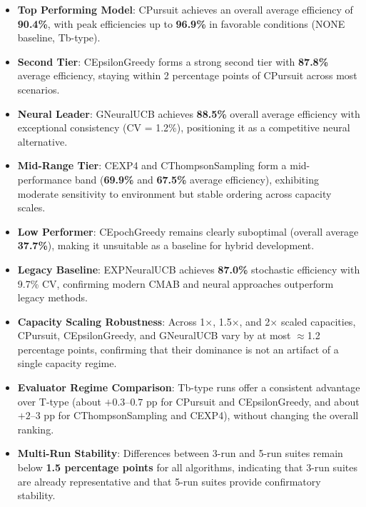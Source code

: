 \documentclass[12pt,a4paper]{article}
\newcommand{\performance}[1]{\textcolor{performancecolor}{\textbf{#1}}}
\newcommand{\critical}[1]{\textcolor{criticalcolor}{\textbf{#1}}}
\newcommand{\success}[1]{\textcolor{successcolor}{\textbf{#1}}}
\newcommand{\legacy}[1]{\textcolor{legacycolor}{\textbf{#1}}}
\newcommand{\neural}[1]{\textcolor{neuralcolor}{\textbf{#1}}}
\begin{document}
\begin{tcolorbox}[colback=highlightcolor!30,colframe=performancecolor,title=\textbf{Key Experimental Results Summary (3-run/5-run, 1$\times$–2$\times$ Capacities, T/Tb Regimes)}]
\begin{itemize}
\item \performance{Top Performing Model}: CPursuit achieves an overall average efficiency of \textbf{90.4\%}, with peak efficiencies up to \textbf{96.9\%} in favorable conditions (NONE baseline, Tb-type).
\item \performance{Second Tier}: CEpsilonGreedy forms a strong second tier with \textbf{87.8\%} average efficiency, staying within 2 percentage points of CPursuit across most scenarios.
\item \neural{Neural Leader}: GNeuralUCB achieves \textbf{88.5\%} overall average efficiency with exceptional consistency (CV = 1.2\%), positioning it as a competitive neural alternative.
\item \performance{Mid-Range Tier}: CEXP4 and CThompsonSampling form a mid-performance band (\textbf{69.9\%} and \textbf{67.5\%} average efficiency), exhibiting moderate sensitivity to environment but stable ordering across capacity scales.
\item \critical{Low Performer}: CEpochGreedy remains clearly suboptimal (overall average \textbf{37.7\%}), making it unsuitable as a baseline for hybrid development.
\item \legacy{Legacy Baseline}: EXPNeuralUCB achieves \textbf{87.0\%} stochastic efficiency with 9.7\% CV, confirming modern CMAB and neural approaches outperform legacy methods.
\item \success{Capacity Scaling Robustness}: Across 1$\times$, 1.5$\times$, and 2$\times$ scaled capacities, CPursuit, CEpsilonGreedy, and GNeuralUCB vary by at most $\approx$1.2 percentage points, confirming that their dominance is not an artifact of a single capacity regime.
\item \success{Evaluator Regime Comparison}: Tb-type runs offer a consistent advantage over T-type (about $+0.3$–$0.7$ pp for CPursuit and CEpsilonGreedy, and about $+2$–$3$ pp for CThompsonSampling and CEXP4), without changing the overall ranking.
\item \success{Multi-Run Stability}: Differences between 3-run and 5-run suites remain below \textbf{1.5 percentage points} for all algorithms, indicating that 3-run suites are already representative and that 5-run suites provide confirmatory stability.
\end{itemize}
\end{tcolorbox}
\end{document}
